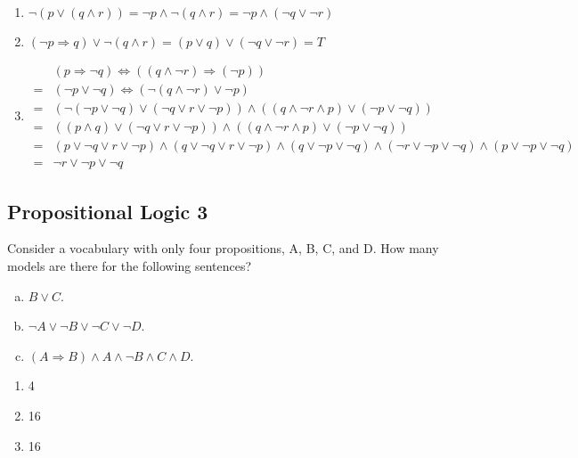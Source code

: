 \documentclass[11pt, answers]{exam}
\begin{document}
\begin{solution}
\begin{enumerate}[a]
\item
$\neg (p \vee (q \wedge r)) = \neg p \wedge \neg (q \wedge r) = \neg p \wedge (\neg q \vee \neg r)$
\item
$(\neg p \Rightarrow q) \vee \neg (q \wedge r) = (p \vee q) \vee (\neg q \vee \neg r) = T$
\item
\begin{align*}
&(p \Rightarrow \neg q) \Leftrightarrow ((q \wedge \neg r) \Rightarrow (\neg p))\\
=&(\neg p \vee \neg q) \Leftrightarrow (\neg (q \wedge \neg r) \vee \neg p)\\
=&(\neg (\neg p \vee \neg q) \vee (\neg q \vee r \vee \neg p)) \wedge ((q \wedge \neg r \wedge p) \vee (\neg p \vee \neg q))\\
=&((p \wedge q) \vee (\neg q \vee r \vee \neg p)) \wedge ((q \wedge \neg r \wedge p) \vee (\neg p \vee \neg q))\\
=&(p \vee \neg q \vee r \vee \neg p) \wedge (q \vee \neg q \vee r \vee \neg p) \wedge (q \vee \neg p \vee \neg q) \wedge (\neg r \vee \neg p \vee \neg q) \wedge (p \vee \neg p \vee \neg q)\\
=&\neg r \vee \neg p \vee \neg q
\end{align*}

\end{enumerate}
\end{solution}

%
%
\begin{questions}
\section{Propositional Logic 3}
\question

Consider a vocabulary with only four propositions, A, B, C, and D. How many models are there for the following sentences?

\begin{enumerate}[a.]
	\item $B \vee C$.
	\item $\neg A\vee \neg B\vee \neg C\vee \neg D$.
	\item $(A\Rightarrow B)\wedge A\wedge\neg B\wedge C\wedge D$.	
\end{enumerate}

\end{questions}

\begin{solution}

\begin{enumerate}[a]
\item
4
\item
16
\item
16
\end{enumerate}

\end{solution}
\end{document}
